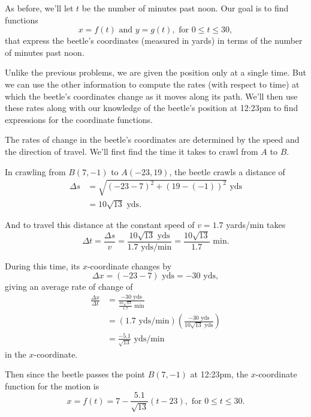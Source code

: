 \documentclass{ximera}
\begin{document}
\begin{explanation}
As before, we'll let $t$ be the number of minutes past noon. Our goal is to find functions
\[
   x = f(t) \text{ and } y = g(t), \text{ for } 0\leq t \leq 30 ,
\]
that express the beetle's coordinates (measured in yards) in terms of the number of minutes past noon.

Unlike the previous problems, we are given the position only at a single time. But we can use the other information to compute the rates (with respect to time) at which the beetle's coordinates change as it moves along its path. We'll then use these rates along with our knowledge of the beetle's position at 12:23pm to find expressions for the coordinate functions. 

The rates of change in the beetle's coordinates are determined by the speed and the direction of travel. We'll first find the time it takes to crawl from $A$ to $B$. 

In crawling from $B(7,-1)$ to $A(-23,19)$, the beetle crawls a distance of
\begin{align*}
  \Delta s  &= \sqrt{(-23 - 7)^2 +   (19 - (-1))^2}  \text{ yds} \\
      & = 10\sqrt{13} \text { yds} .
\end{align*}

And to travel this distance at the constant speed of $v = 1.7$ yards/min takes
\[
       \Delta t = \frac{\Delta s}{v}   = \frac{10 \sqrt{13} \text { yds}}{1.7 \text{ yds/min}} = \frac{10 \sqrt{13}}{1.7 } \text{ min} .
\]

During this time, its $x$-coordinate changes by
\[
   \Delta x = (-23 - 7) \text{ yds} = -30 \text{ yds} ,
\]
giving an average rate of change of
\begin{align*}
  \frac{\Delta x}{\Delta t} &= \frac{-30 \text{ yds}}{\frac{10 \sqrt{13}}{1.7} \text{ min}}  \\
                                     & = \left( 1.7 \text{ yds/min} \right) \left( \frac{-30 \text{ yds}}{10\sqrt{13} \text{ yds}} \right) \label{Eq:RateofChange} \\
                                     & = \frac{-5.1}{\sqrt{13}} \text{ yds/min}  
\end{align*}
in the $x$-coordinate. 

Then since the beetle passes the point $B(7,-1)$ at 12:23pm,  the $x$-coordinate function for the motion is
\[
     x = f(t) = 7 - \frac{5.1}{\sqrt{13}}\left( t-23 \right) , \text{ for } 0\leq t \leq 30 .
\]


\end{explanation}
\end{document}
